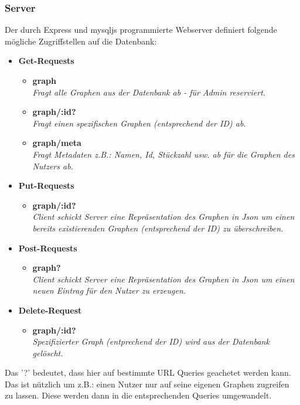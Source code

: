 \documentclass[twoside]{report}
\begin{document}
\subsubsection{Server}

Der durch Express und mysqljs programmierte Webserver definiert folgende mögliche Zugriffstellen auf die Datenbank:
\begin{itemize}
\item \textbf{Get-Requests}
  \begin{itemize}
    \item \textbf{graph}
      \\\textit{Fragt alle Graphen aus der Datenbank ab - für Admin reserviert.}
    \item \textbf{graph/:id?}
      \\\textit{Fragt einen spezifischen Graphen (entsprechend der ID) ab.}
    \item \textbf{graph/meta}
      \\\textit{Fragt Metadaten z.B.: Namen, Id, Stückzahl usw. ab für die Graphen des Nutzers ab.}
  \end{itemize}
\item  \textbf{Put-Requests}
  \begin{itemize}
    \item \textbf{graph/:id?}
      \\\textit{Client schickt Server eine Repräsentation des Graphen in Json um einen bereits existierenden Graphen (entsprechend der ID) zu überschreiben.}
  \end{itemize}
\item \textbf{Post-Requests}
  \begin{itemize}
    \item \textbf{graph?}
      \\\textit{Client schickt Server eine Repräsentation des Graphen in Json um einen neuen Eintrag für den Nutzer zu erzeugen.}
  \end{itemize}
\item \textbf{Delete-Request}
  \begin{itemize}
    \item \textbf{graph/:id?}
      \\\textit{Spezifizierter Graph (entprechend der ID) wird aus der Datenbank gelöscht.}
  \end{itemize}
\end{itemize}

Das '?' bedeutet, dass hier auf bestimmte URL Queries geachetet werden kann.
Das ist nützlich um z.B.: einen Nutzer nur auf seine eigenen Graphen zugreifen zu lassen.
Diese werden dann in die entsprechenden Queries umgewandelt.\\
\end{document}
